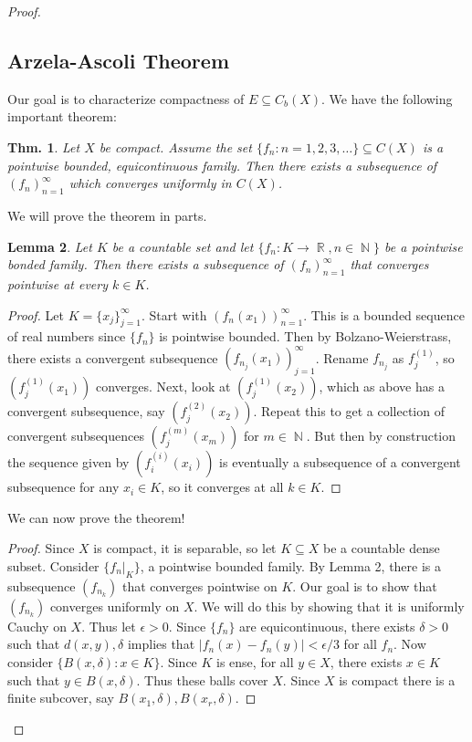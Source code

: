 \documentclass[12pt, a4paper]{book}
\DeclareMathOperator{\N}{\mathbb{N}}
\DeclareMathOperator{\R}{\mathbb{R}}
\newtheorem{theorem}{Thm.}[section]
\newtheorem{lemma}[theorem]{Lemma}
\theoremstyle{nonumberplain}
\newtheorem{proof}{Proof}
\begin{document}
\begin{proof}
\subsection{Arzela-Ascoli Theorem}
Our goal is to characterize compactness of $E\subseteq C_b(X)$.
We have the following important theorem:
\begin{theorem}
    Let $X$ be compact.
    Assume the set $\{f_n:n=1,2,3,\ldots\}\subseteq C(X)$ is a pointwise bounded, equicontinuous family.
    Then there exists a subsequence of $(f_n)_{n=1}^\infty$ which converges uniformly in $C(X)$.
\end{theorem}
We will prove the theorem in parts.
\begin{lemma}
    Let $K$ be a countable set and let $\{f_n:K\to\R,n\in\N\}$ be a pointwise bonded family.
    Then there exists a subsequence of $(f_n)_{n=1}^\infty$ that converges pointwise at every $k\in K$.
\end{lemma}
\begin{proof}
    Let $K=\{x_j\}_{j=1}^\infty$.
    Start with $(f_n(x_1))_{n=1}^\infty$.
    This is a bounded sequence of real numbers since $\{f_n\}$ is pointwise bounded.
    Then by Bolzano-Weierstrass, there exists a convergent subsequence $(f_{n_j}(x_1))_{j=1}^\infty$.
    Rename $f_{n_j}$ as $f_j^{(1)}$, so $(f_j^{(1)}(x_1))$ converges.
    Next, look at $(f_j^{(1)}(x_2))$, which as above has a convergent subsequence, say $(f_j^{(2)}(x_2))$.
    Repeat this to get a collection of convergent subsequences $(f_j^{(m)}(x_m))$ for $m\in\N$.
    But then by construction the sequence given by $(f_i^{(i)}(x_i))$ is eventually a subsequence of a convergent subsequence for any $x_i\in K$, so it converges at all $k\in K$.
\end{proof}
We can now prove the theorem!
\begin{proof}
    Since $X$ is compact, it is separable, so let $K\subseteq X$ be a countable dense subset.
    Consider $\{f_n|_K\}$, a pointwise bounded family.
    By Lemma 2, there is a subsequence $(f_{n_k})$ that converges pointwise on $K$.
    Our goal is to show that $(f_{n_k})$ converges uniformly on $X$.
    We will do this by showing that it is uniformly Cauchy on $X$.
    Thus let $\epsilon>0$.
    Since $\{f_n\}$ are equicontinuous, there exists $\delta>0$ such that $d(x,y),\delta$ implies that $|f_n(x)-f_n(y)|<\epsilon/3$ for all $f_n$.
    Now consider $\{B(x,\delta):x\in K\}$.
    Since $K$ is ense, for all $y\in X$, there exists $x\in K$ such that $y\in B(x,\delta)$.
    Thus these balls cover $X$.
    Since $X$ is compact there is a finite subcover, say $B(x_1,\delta),B(x_r,\delta)$.

\end{proof}
\end{proof}
\end{document}
